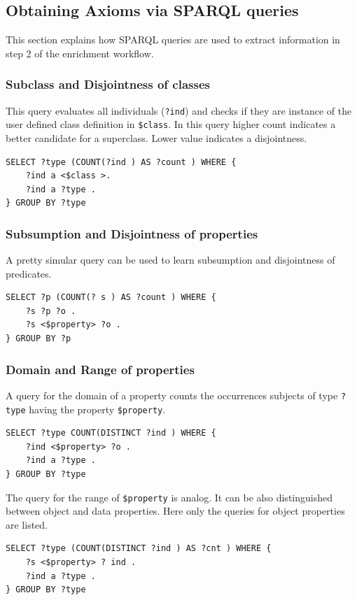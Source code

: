 \subsection*{Obtaining Axioms via SPARQL queries}
This section explains how SPARQL queries are used to extract information in step
2 of the enrichment workflow.

\subsubsection*{Subclass and Disjointness of classes}
This query evaluates all individuals (\texttt{?ind}) and checks if they are
instance of the user defined class definition in \texttt{\$class}. In this query
higher count indicates a better candidate for a superclass. 
Lower value indicates a disjointness.
 
\begin{lstlisting} 
SELECT ?type (COUNT(?ind ) AS ?count ) WHERE {
	?ind a <$class >.
	?ind a ?type .
} GROUP BY ?type
\end{lstlisting}

\subsubsection*{Subsumption and Disjointness of properties}
A pretty simular query can be used to learn subsumption and disjointness of
predicates.

\begin{lstlisting} 
SELECT ?p (COUNT(? s ) AS ?count ) WHERE {
	?s ?p ?o .
	?s <$property> ?o .
} GROUP BY ?p
\end{lstlisting}

\subsubsection*{Domain and Range of properties}
A query for the domain of a property counts the occurrences subjects of type
\texttt{?type} having the property \texttt{\$property}.

\begin{lstlisting} 
SELECT ?type COUNT(DISTINCT ?ind ) WHERE {
	?ind <$property> ?o .
	?ind a ?type .
} GROUP BY ?type
\end{lstlisting}

The query for the range of \texttt{\$property} is analog. It can be also
distinguished between object and data properties. Here only the queries for
object properties are listed.
\begin{lstlisting} 
SELECT ?type (COUNT(DISTINCT ?ind ) AS ?cnt ) WHERE {
	?s <$property> ? ind .
	?ind a ?type .
} GROUP BY ?type
\end{lstlisting}


